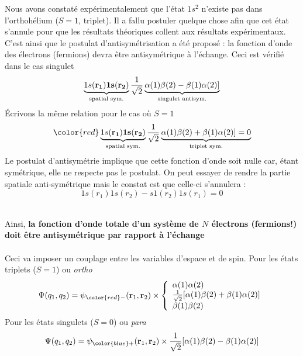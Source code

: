 Nous avons constaté expérimentalement que l'état $1s^2$ n'existe pas dans l'orthohélium ($S=1$, 
triplet). Il a fallu postuler quelque chose afin que cet état s'annule pour que les résultats
théoriques collent aux résultats expérimentaux. C'est ainsi que le postulat d'antisymétrisation a
été proposé : la fonction d'onde des électrons (fermions) devra être antisymétrique à l'échange. Ceci
est vérifié dans le cas singulet
\begin{equation}
\underbrace{1s(\bf{r}_1)1s(\bf{r}_2)}_{\text{spatial sym.}}
\frac{1}{\sqrt{2}} 
\underbrace{ \alpha(1) \beta(2) - \beta(1) \alpha(2) ]}_{\text{singulet antisym.}}
\end{equation}
Écrivons la même relation pour le cas où $S=1$
\begin{equation}
{\color{red}
\underbrace{1s(\bf{r}_1)1s(\bf{r}_2)}_{\text{spatial sym.}}
\frac{1}{\sqrt{2}} 
\underbrace{ \alpha(1) \beta(2) + \beta(1) \alpha(2) ] = 0 }_{\text{triplet sym.}}}
\end{equation}
Le postulat d'antisymétrie implique que cette fonction d'onde soit nulle car, étant symétrique, elle
ne respecte pas le postulat. On peut essayer de rendre la partie spatiale anti-symétrique mais le
constat est que celle-ci s'annulera :
\begin{equation}
1s(r_1)1s(r_2) - s1(r_2)1s(r_1) = 0
\end{equation}\ 

Ainsi, \textbf{la fonction d'onde totale d'un système de $N$ électrons (fermions!) doit être 
antisymétrique par rapport à l'échange}\ \\

\ \\

Ceci va imposer un couplage entre les variables d'espace et de spin. Pour les états triplets 
($S=1$) ou \textit{ortho}
\begin{equation}
\Psi (q_1,q_2) = \psi_{\color{red} - } ( {\bf r}_1, {\bf r}_2 ) \times
\left\{
\begin{array}{l}
\alpha(1) \alpha(2) \\
\frac{1}{\sqrt{2}} 
[ \alpha(1) \beta(2) + \beta(1) \alpha(2) ] \\
\beta(1) \beta(2) 
\end{array} \right.
\end{equation}
Pour les états singulets ($S=0$) ou \textit{para}
\begin{equation}
\Psi (q_1,q_2) = \psi_
{\color{blue} +}  ( {\bf r}_1, {\bf r}_2 ) \times
\frac{1}{\sqrt{2}} 
[ \alpha(1) \beta(2) - \beta(1) \alpha(2) ]
\end{equation}

